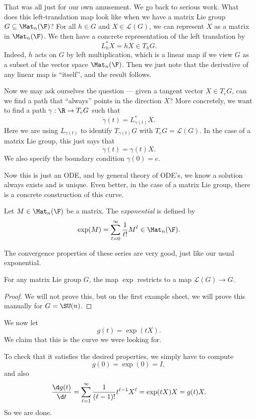 \documentclass[a4paper]{article}
\begin{document}
That was all just for our own amusement. We go back to serious work. What does this left-translation map look like when we have a matrix Lie group $G \subseteq \Mat_n(\F)$? For all $h \in G$ and $X \in \mathcal{L} (G)$, we can represent $X$ as a matrix in $\Mat_n(\F)$. We then have a concrete representation of the left translation by
\[
  L_h^*X = hX \in T_hG.
\]
Indeed, $h$ acts on $G$ by left multiplication, which is a linear map if we view $G$ as a subset of the vector space $\Mat_n(\F)$. Then we just note that the derivative of any linear map is ``itself'', and the result follows.

Now we may ask ourselves the question --- given a tangent vector $X \in T_eG$, can we find a path that ``always'' points in the direction $X$? More concretely, we want to find a path $\gamma: \R \to T_e G$ such that
\[
  \dot{\gamma}(t) = L_{\gamma(t)}^* X.
\]
Here we are using $L_{\gamma(t)}$ to identify $T_{\gamma(t)}G$ with $T_e G = \mathcal{L}(G)$. In the case of a matrix Lie group, this just says that
\[
  \dot{\gamma}(t) = \gamma(t) X.
\]
We also specify the boundary condition $\gamma(0) = e$.

Now this is just an ODE, and by general theory of ODE's, we know a solution always exists and is unique. Even better, in the case of a matrix Lie group, there is a concrete construction of this curve.
\begin{defi}[Exponential]
  Let $M \in \Mat_n(\F)$ be a matrix. The \emph{exponential} is defined by
  \[
    \exp(M) = \sum_{\ell = 0}^\infty \frac{1}{\ell!} M^\ell \in \Mat_n(\F).
  \]
\end{defi}
The convergence properties of these series are very good, just like our usual exponential.

\begin{thm}
  For any matrix Lie group $G$, the map $\exp$ restricts to a map $\mathcal{L}(G) \to G$.
\end{thm}

\begin{proof}
  We will not prove this, but on the first example sheet, we will prove this manually for $G = \SU(n)$.
\end{proof}

We now let
\[
  g(t) = \exp(tX).
\]
We claim that this is the curve we were looking for.

To check that it satisfies the desired properties, we simply have to compute
\[
  g(0) = \exp(0) = I,
\]
and also
\[
  \frac{\d g(t)}{\d t} = \sum_{\ell = 1}^\infty \frac{1}{(\ell - 1)!} t^{\ell - 1} X^\ell = \exp(tX) X = g(t) X.
\]
So we are done.
\end{document}

